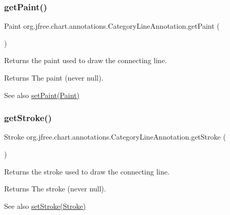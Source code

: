 \subsubsection{\texorpdfstring{get\+Paint()}{getPaint()}}
{\footnotesize\ttfamily Paint org.\+jfree.\+chart.\+annotations.\+Category\+Line\+Annotation.\+get\+Paint (\begin{DoxyParamCaption}{ }\end{DoxyParamCaption})}

Returns the paint used to draw the connecting line.

\begin{DoxyReturn}{Returns}
The paint (never {\ttfamily null}).
\end{DoxyReturn}
\begin{DoxySeeAlso}{See also}
\mbox{\hyperlink{classorg_1_1jfree_1_1chart_1_1annotations_1_1_category_line_annotation_a52c504b2c4291d9d6749f1d6460fbfec}{set\+Paint(\+Paint)}} 
\end{DoxySeeAlso}
\mbox{\label{classorg_1_1jfree_1_1chart_1_1annotations_1_1_category_line_annotation_a3911b0d648b52e13cf946df090854aee}} 
\subsubsection{\texorpdfstring{get\+Stroke()}{getStroke()}}
{\footnotesize\ttfamily Stroke org.\+jfree.\+chart.\+annotations.\+Category\+Line\+Annotation.\+get\+Stroke (\begin{DoxyParamCaption}{ }\end{DoxyParamCaption})}

Returns the stroke used to draw the connecting line.

\begin{DoxyReturn}{Returns}
The stroke (never {\ttfamily null}).
\end{DoxyReturn}
\begin{DoxySeeAlso}{See also}
\mbox{\hyperlink{classorg_1_1jfree_1_1chart_1_1annotations_1_1_category_line_annotation_a0f78238a070be985783f23037603b14e}{set\+Stroke(\+Stroke)}} 
\end{DoxySeeAlso}
\mbox{\label{classorg_1_1jfree_1_1chart_1_1annotations_1_1_category_line_annotation_a5237dccaaf690f7352535377216b04f5}} 
